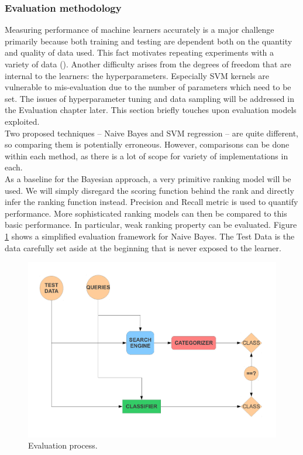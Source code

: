 \documentclass[12pt,notitlepage,twoside]{scrreprt}
\begin{document}
\subsubsection*{Evaluation methodology}
Measuring performance of machine learners accurately is a major challenge
primarily because both training and testing are dependent both on the quantity
and quality of data used. This fact motivates repeating experiments with a
variety of data (). Another difficulty arises from the
degrees of freedom that are internal to the learners: the hyperparameters.
Especially SVM kernels are vulnerable to mis-evaluation due to the number of
parameters which need to be set. The issues of hyperparameter tuning and data
sampling will be addressed in the Evaluation chapter later. This section
briefly touches upon evaluation models exploited.\\
Two proposed techniques -- Naive Bayes and SVM regression -- are quite different, so
comparing them is potentially erroneous. However, comparisons can be done
within each method, as there is a lot of scope for variety of implementations
in each.\\
As a baseline for the Bayesian approach, a very primitive ranking model will be
used. We will simply disregard the scoring function behind the rank and
directly infer the ranking function instead. Precision and Recall metric is
used to quantify performance. More sophisticated ranking models
can then be compared to this basic performance. In particular, weak ranking
property can be evaluated.
Figure \ref{eval} shows a simplified evaluation framework for Naive Bayes.  The Test Data
is the data carefully set aside at the beginning that is never exposed to the
learner. 
\begin{figure}[h]
\centering
\includegraphics[scale=0.5]{figs/eval.pdf}
\caption{Evaluation process. }
\label{eval}
\end{figure}
\end{document}
